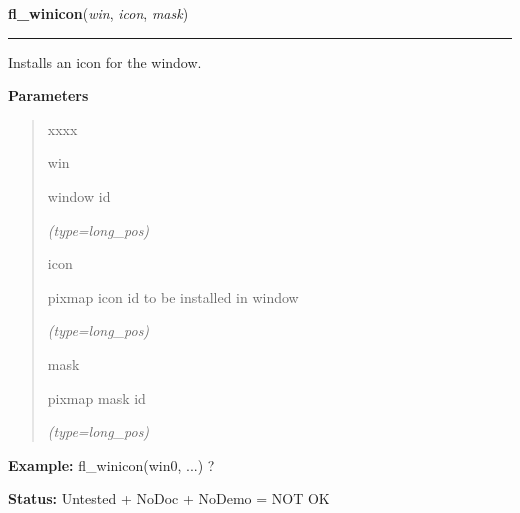     \label{xformslib:flxbasic:fl_winicon}

    \vspace{0.5ex}

\hspace{.8\funcindent}\begin{boxedminipage}{\funcwidth}

    \raggedright \textbf{fl\_winicon}(\textit{win}, \textit{icon}, \textit{mask})

    \vspace{-1.5ex}

    \rule{\textwidth}{0.5\fboxrule}
\setlength{\parskip}{2ex}
    Installs an icon for the window.

\setlength{\parskip}{1ex}
      \textbf{Parameters}
      \vspace{-1ex}

      \begin{quote}
        \begin{Ventry}{xxxx}

          \item[win]

          window id

            {\it (type=long\_pos)}

          \item[icon]

          pixmap icon id to be installed in window

            {\it (type=long\_pos)}

          \item[mask]

          pixmap mask id

            {\it (type=long\_pos)}

        \end{Ventry}

      \end{quote}

\textbf{Example:} fl\_winicon(win0, ...) ?



\textbf{Status:} Untested + NoDoc + NoDemo = NOT OK



    \end{boxedminipage}

    \label{xformslib:flxbasic:fl_winbackground}

